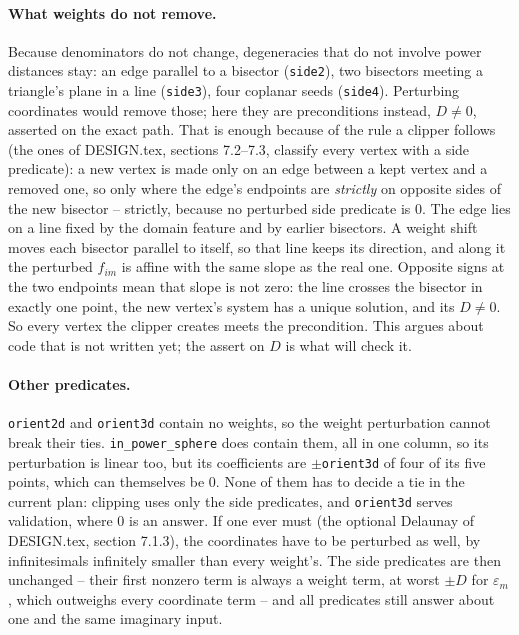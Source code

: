 \documentclass[11pt,a4paper]{article}
\newcommand{\code}[1]{\texttt{#1}}
\theoremstyle{definition}
\theoremstyle{remark}
\begin{document}
\paragraph{What weights do not remove.} Because denominators do not change, degeneracies that do
not involve power distances stay: an edge parallel to a bisector (\code{side2}), two bisectors
meeting a triangle's plane in a line (\code{side3}), four coplanar seeds (\code{side4}). Perturbing
coordinates would remove those; here they are preconditions instead, $D \neq 0$, asserted on the
exact path. That is enough because of the rule a clipper follows (the ones of DESIGN.tex,
sections 7.2--7.3, classify every vertex with a side predicate): a new vertex is made only on an
edge between a kept vertex and a removed one, so only where the edge's endpoints are
\emph{strictly} on opposite sides of the new bisector -- strictly, because no perturbed side
predicate is 0. The edge lies on a line fixed by the domain feature and by earlier bisectors. A weight shift moves each bisector parallel to
itself, so that line keeps its direction, and along it the perturbed $f_{im}$ is affine with the
same slope as the real one. Opposite signs at the two endpoints mean that slope is not zero: the
line crosses the bisector in exactly one point, the new vertex's system has a unique solution, and
its $D \neq 0$. So every vertex the clipper creates meets the precondition. This argues about code
that is not written yet; the assert on $D$ is what will check it.

\paragraph{Other predicates.} \code{orient2d} and \code{orient3d} contain no weights, so the
weight perturbation cannot break their ties. \code{in\_power\_sphere} does contain them, all in one
column, so its perturbation is linear too, but its coefficients are $\pm$\code{orient3d} of four of
its five points, which can themselves be 0. None of them has to decide a tie in the current plan:
clipping uses only the side predicates, and \code{orient3d} serves validation, where 0 is an
answer. If one ever must (the optional Delaunay of DESIGN.tex, section 7.1.3), the coordinates have to
be perturbed as well, by infinitesimals infinitely smaller than every weight's. The side predicates
are then unchanged -- their first nonzero term is always a weight term, at worst $\pm D$ for
$\varepsilon_m$, which outweighs every coordinate term -- and all predicates still answer about one
and the same imaginary input.
\end{document}
